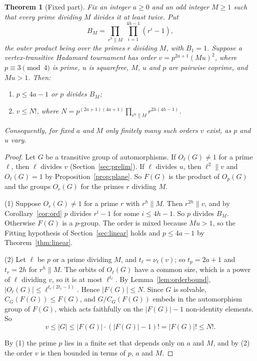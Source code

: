 \documentclass[11pt]{amsart}
\newtheorem{theorem}{Theorem}
\theoremstyle{definition}
\theoremstyle{remark}
\begin{document}
\begin{theorem}[Fixed part]\label{thm:fixedpart}
Fix an integer $a\ge0$ and an odd integer $M\ge1$ such that every prime dividing $M$ divides it at least twice. Put
\[
B_M=\prod_{r^h\parallel M}\ \prod_{i=1}^{4h-1}(r^i-1),
\]
the outer product being over the primes $r$ dividing $M$, with $B_1=1$. Suppose a vertex-transitive Hadamard tournament has order $v=p^{2a+1}(Mu)^2$, where $p\equiv3\pmod4$ is prime, $u$ is squarefree, $M$, $u$ and $p$ are pairwise coprime, and $Mu>1$. Then:
\begin{enumerate}
\item $p\le4a-1$ or $p$ divides $B_M$;
\item $v\le N!$, where $N=p^{(2a+1)(4a+1)}\prod_{r^h\parallel M}r^{2h(4h-1)}$.
\end{enumerate}
Consequently, for fixed $a$ and $M$ only finitely many such orders $v$ exist, as $p$ and $u$ vary.
\end{theorem}
\begin{proof}
Let $G$ be a transitive group of automorphisms. If $O_\ell(G)\ne1$ for a prime $\ell$, then $\ell$ divides $v$ (Section~\ref{sec:prelim}). If $\ell$ divides $u$, then $\ell^2\parallel v$ and $O_\ell(G)=1$ by Proposition~\ref{prop:plane}. So $F(G)$ is the product of $O_p(G)$ and the groups $O_r(G)$ for the primes $r$ dividing $M$.

(1) Suppose $O_r(G)\ne1$ for a prime $r$ with $r^h\parallel M$. Then $r^{2h}\parallel v$, and by Corollary~\ref{cor:ord} $p$ divides $r^i-1$ for some $i\le4h-1$. So $p$ divides $B_M$. Otherwise $F(G)$ is a $p$-group. The order is mixed because $Mu>1$, so the Fitting hypothesis of Section~\ref{sec:linear} holds and $p\le4a-1$ by Theorem~\ref{thm:linear}.

(2) Let $\ell$ be $p$ or a prime dividing $M$, and $t_\ell=\nu_\ell(v)$; so $t_p=2a+1$ and $t_r=2h$ for $r^h\parallel M$. The orbits of $O_\ell(G)$ have a common size, which is a power of $\ell$ dividing $v$, so it is at most $\ell^{t_\ell}$. By Lemma~\ref{lem:orderbound}, $|O_\ell(G)|\le\ell^{t_\ell(2t_\ell-1)}$. Hence $|F(G)|\le N$. Since $G$ is solvable, $C_G(F(G))\le F(G)$, and $G/C_G(F(G))$ embeds in the automorphism group of $F(G)$, which acts faithfully on the $|F(G)|-1$ non-identity elements. So
\[
v\le|G|\le|F(G)|\cdot(|F(G)|-1)!=|F(G)|!\le N! .
\]

By (1) the prime $p$ lies in a finite set that depends only on $a$ and $M$, and by (2) the order $v$ is then bounded in terms of $p$, $a$ and $M$.
\end{proof}
\end{document}

